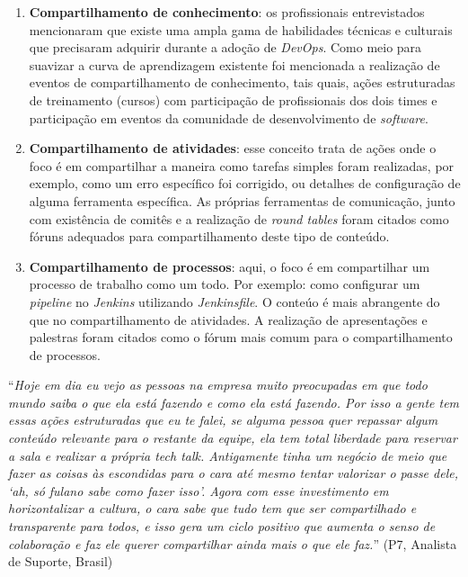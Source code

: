 \begin{enumerate}
\item {\bf Compartilhamento de conhecimento}: os profissionais entrevistados
mencionaram que existe uma ampla gama de habilidades técnicas e culturais que
precisaram adquirir durante a adoção de {\it DevOps}. Como meio para suavizar a
curva de aprendizagem existente foi mencionada a realização de eventos de
compartilhamento de conhecimento, tais quais, ações estruturadas de treinamento
(cursos) com participação de profissionais dos dois times e participação em
eventos da comunidade de desenvolvimento de {\it software}.

\item {\bf Compartilhamento de atividades}: esse conceito trata de ações onde o
foco é em compartilhar a maneira como tarefas simples foram realizadas, por
exemplo, como um erro específico foi corrigido, ou detalhes de configuração de
alguma ferramenta específica. As próprias ferramentas de comunicação, junto com
existência de comitês e a realização de {\it round tables} foram citados como
fóruns adequados para compartilhamento deste tipo de conteúdo.

\item {\bf Compartilhamento de processos}: aqui, o foco é em compartilhar um
processo de trabalho como um todo. Por exemplo: como configurar um {\it pipeline}
no {\it Jenkins} utilizando {\it Jenkinsfile}. O conteúo é mais abrangente do
que no compartilhamento de atividades. A realização de apresentações e palestras
foram citados como o fórum mais comum para o compartilhamento de processos.
\end{enumerate}

\begin{mq}
``\emph{Hoje em dia eu vejo as pessoas na empresa muito preocupadas em que todo
mundo saiba o que ela está fazendo e como ela está fazendo. Por isso a gente
tem essas ações estruturadas que eu te falei, se alguma pessoa quer repassar
algum conteúdo relevante para o restante da equipe, ela tem total liberdade para
reservar a sala e realizar a própria tech talk. Antigamente tinha um negócio de
meio que fazer as coisas às escondidas para o cara até mesmo tentar valorizar
o passe dele, `ah, só fulano sabe como fazer isso'. Agora com esse investimento
em horizontalizar a cultura, o cara sabe que tudo tem que ser compartilhado e
transparente para todos, e isso gera um ciclo positivo que aumenta o senso
de colaboração e faz ele querer compartilhar ainda mais o que ele faz.}''
(P7, Analista de Suporte, Brasil)
\end{mq}

